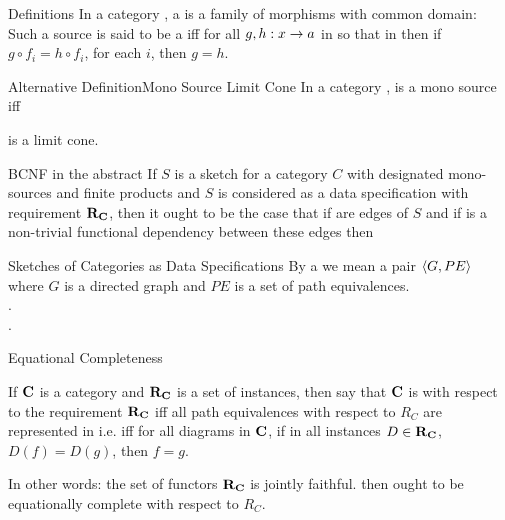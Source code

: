 \begin{frame}{Definitions} 
In a category \catc, a   is a family of morphisms with common domain: \\
\medskip
Such a source is said to be a   iff for all $g,h:x \rightarrow a$ in \catcw 
so that  
in \catcw then if $g \circ f_i = h \circ f_i$, for each $i$,  then $g=h$.
\end{frame}

\begin{frame}{Alternative Definition}{Mono Source Limit Cone}  
In a category ,
\scalebox{0.65}{

} is a mono source iff \\
\begin{center}
\scalebox{0.65}{

} 
is a limit cone.
\end{center}
\end{frame}

\begin{frame}{BCNF in the abstract}
If $S$ is a sketch for a category $C$ with designated mono-sources  and finite products
and $S$ is considered as a data specification with requirement $\textbf{R}_{\textbf{C}}$, then it ought to be the case
that if 
are edges of $S$
and if   is a non-trivial functional dependency  between these edges
then 
\end{frame}


\begin{frame}{Sketches of Categories as Data Specifications}
By a  we mean a pair $\langle G,PE\rangle$ where 
$G$ is a directed graph and $PE$ is a set of path equivalences. \\
\medskip
\goodnessoneA. \\
\medskip
\goodnessoneB.
\end{frame}

\begin{frame}{Equational Completeness}
\begin{definition}
If $\textbf{C}$ is a  category and $\textbf{R}_{\textbf{C}}$ is a set of instances,
 then say that  $\textbf{C}$ is  with respect 
to the requirement $\textbf{R}_{\textbf{C}}$ iff all path equivalences with respect to $R_C$ are represented in \catcw 
i.e. iff for all diagrams \fgparalleldiagram in $\textbf{C}$,  
if in all instances $D \in \textbf{R}_{\textbf{C}}$, $D(f)=D(g)$,  then $f=g$.
\end{definition}

In other words:
the set of functors $\textbf{R}_{\textbf{C}}$ is jointly faithful.
\medskip
{} \IfSforCwithRCwords then \catcw ought to be equationally complete
with respect to $R_C$.
\end{frame}

